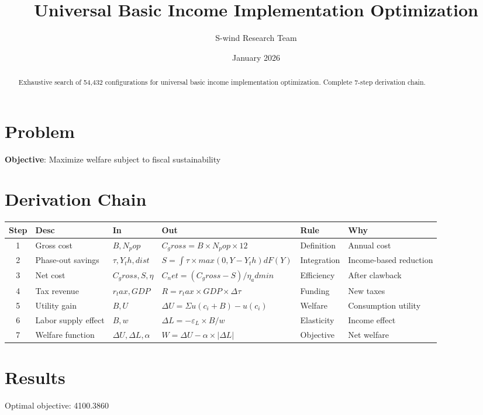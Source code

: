 \documentclass[11pt]{article}
\title{Universal Basic Income Implementation Optimization}
\author{S-wind Research Team}
\date{January 2026}
\begin{document}
\maketitle

\begin{abstract}
Exhaustive search of 54,432 configurations for universal basic income implementation optimization. Complete 7-step derivation chain.
\end{abstract}

\section{Problem}
\textbf{Objective}: Maximize welfare subject to fiscal sustainability

\section{Derivation Chain}
\begin{longtable}{|c|p{2cm}|p{2cm}|p{3cm}|p{2cm}|p{3cm}|}
\hline
Step & Desc & In & Out & Rule & Why\\\hline\endhead
1 & Gross cost & $B, N_pop$ & $C_gross = B × N_pop × 12$ & Definition & Annual cost\\\hline
2 & Phase-out savings & $τ, Y_th, dist$ & $S = ∫τ×max(0,Y-Y_th)dF(Y)$ & Integration & Income-based reduction\\\hline
3 & Net cost & $C_gross, S, η$ & $C_net = (C_gross - S) / η_admin$ & Efficiency & After clawback\\\hline
4 & Tax revenue & $r_tax, GDP$ & $R = r_tax × GDP × Δτ$ & Funding & New taxes\\\hline
5 & Utility gain & $B, U$ & $ΔU = Σ u(c_i + B) - u(c_i)$ & Welfare & Consumption utility\\\hline
6 & Labor supply effect & $B, w$ & $ΔL = -ε_L × B/w$ & Elasticity & Income effect\\\hline
7 & Welfare function & $ΔU, ΔL, α$ & $W = ΔU - α × |ΔL|$ & Objective & Net welfare\\\hline
\end{longtable}

\section{Results}
Optimal objective: 4100.3860
\end{document}
